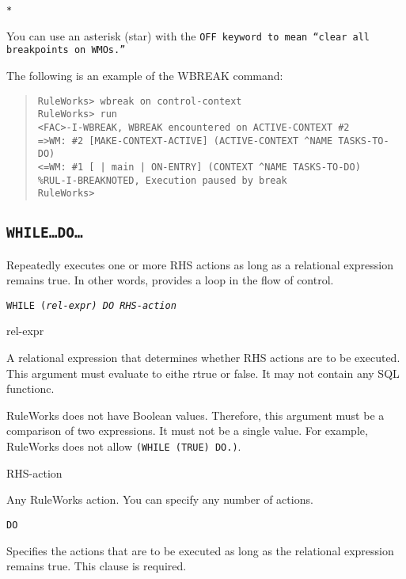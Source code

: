 {{\tt{*}

You can use an asterisk (star) with the \tt{OFF} keyword to mean
``clear all breakpoints on WMOs.''

\Example

The following is an example of the WBREAK command:

\begin{quote}
\begin{verbatim}
RuleWorks> wbreak on control-context
RuleWorks> run
<FAC>-I-WBREAK, WBREAK encountered on ACTIVE-CONTEXT #2
=>WM: #2 [MAKE-CONTEXT-ACTIVE] (ACTIVE-CONTEXT ^NAME TASKS-TO-DO)
<=WM: #1 [ | main | ON-ENTRY] (CONTEXT ^NAME TASKS-TO-DO)
%RUL-I-BREAKNOTED, Execution paused by break
RuleWorks>
\end{verbatim}
\end{quote}

\subsection{\tt{WHILE}\ldots\tt{DO}\ldots}

Repeatedly executes one or more RHS actions as long as a relational
expression remains true. In other words, provides a loop in the flow
of control.

\Format

\tt{WHILE} \tt(\it{rel-expr}\tt) \tt{DO} \it{RHS-action}

\begin{arguments}
\item[rel-expr]

  A relational expression that determines whether RHS actions are to
  be executed. This argument must evaluate to eithe rtrue or false. It
  may not contain any SQL functionc.

\begin{note}
  RuleWorks does not have Boolean values. Therefore, this argument
  must be a comparison of two expressions. It must not be a single
  value. For example, RuleWorks does not allow
  \verb|(WHILE (TRUE) DO.)|.
\end{note}

\item[RHS-action]

  Any RuleWorks action. You can specify any number of actions.
\end{arguments}

\Clause

\tt{DO}

Specifies the actions that are to be executed as long as the
relational expression remains true. This clause is required.

}}
